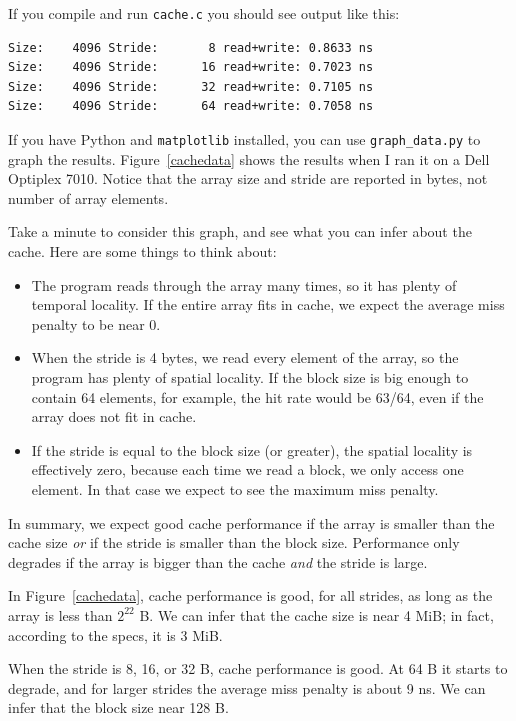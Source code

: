 \documentclass[12pt]{book}
\begin{document}
{If you compile and run {\tt cache.c} you should see output like this:

\begin{verbatim}
Size:    4096 Stride:       8 read+write: 0.8633 ns
Size:    4096 Stride:      16 read+write: 0.7023 ns
Size:    4096 Stride:      32 read+write: 0.7105 ns
Size:    4096 Stride:      64 read+write: 0.7058 ns
\end{verbatim}

If you have Python and {\tt matplotlib} installed, you can use
\verb"graph_data.py" to graph the results.  Figure~\ref{cachedata}
shows the results when I ran it on a Dell Optiplex 7010.
Notice that the array size and stride are reported in
bytes, not number of array elements.

Take a minute to consider this graph, and see what you can infer
about the cache.  Here are some things to think about:

\begin{itemize}

\item The program reads through the array many times, so it has plenty
  of temporal locality.  If the entire array fits in cache, we expect
  the average miss penalty to be near 0.

\item When the stride is 4 bytes, we read every element of the array,
  so the program has plenty of spatial locality.  If the block size is
  big enough to contain 64 elements, for example, the hit rate would
  be 63/64, even if the array does not fit in cache.

\item If the stride is equal to the block size (or greater), the
  spatial locality is effectively zero, because each time we read a
  block, we only access one element.  In that case we expect to see
  the maximum miss penalty.

\end{itemize}

In summary, we expect good cache performance if the array is smaller
than the cache size {\em or} if the stride is smaller than the block
size.  Performance only degrades if the array is bigger than the
cache {\em and} the stride is large.

In Figure~\ref{cachedata}, cache performance is good, for all strides,
as long as the array is less than $2^{22}$ B.  We can infer that the
cache size is near 4 MiB; in fact, according to the specs, it is 3
MiB.

When the stride is 8, 16, or 32 B, cache performance is good.  At 64 B
it starts to degrade, and for larger strides the average miss
penalty is about 9 ns.  We can infer that the block size near 128 B.

}
\end{document}
